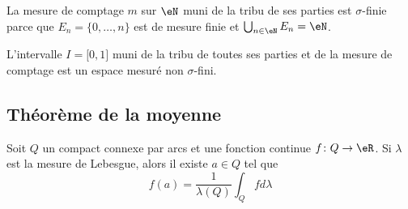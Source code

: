 \begin{example}
    La mesure de comptage \( m\) sur \( \eN\) muni de la tribu de ses parties est \( \sigma\)-finie parce que \( E_n=\{ 0,\ldots, n \}\) est de mesure finie et \( \bigcup_{n\in \eN}E_n=\eN\).
\end{example}

\begin{example}
    L'intervalle \( I=\mathopen[ 0 , 1 \mathclose]\) muni de la tribu de toutes ses parties et de la mesure de comptage est un espace mesuré non \( \sigma\)-fini.
\end{example}

\subsection{Théorème de la moyenne}

\begin{theorem}      \label{ThoooEZLGooMChwLT}
    Soit \( Q\) un compact connexe par arcs et une fonction continue \( f\colon Q\to \eR\). Si \( \lambda\) est la mesure de Lebesgue, alors il existe \( a\in Q\) tel que
    \begin{equation}
        f(a)=\frac{1}{ \lambda(Q) }\int_Qfd\lambda
    \end{equation}
\end{theorem}

